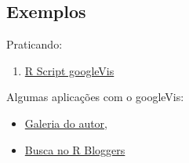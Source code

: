 \subsection*{Exemplos}

\begin{frame}

 Praticando:
  \begin{enumerate}
  \item
    \href{run:./R/googleVis/googleVis.R}{R Script googleVis}
  \end{enumerate}

  \vspace{0.5cm}
  Algumas aplicações com o googleVis:
  \begin{itemize}
  \item \href{http://cran.r-project.org/web/packages/googleVis/vignettes/}{Galeria
      do autor},
  \item \href{http://www.r-bloggers.com/?s=googleVis}{Busca no R
      Bloggers}
  \end{itemize}

\end{frame}
